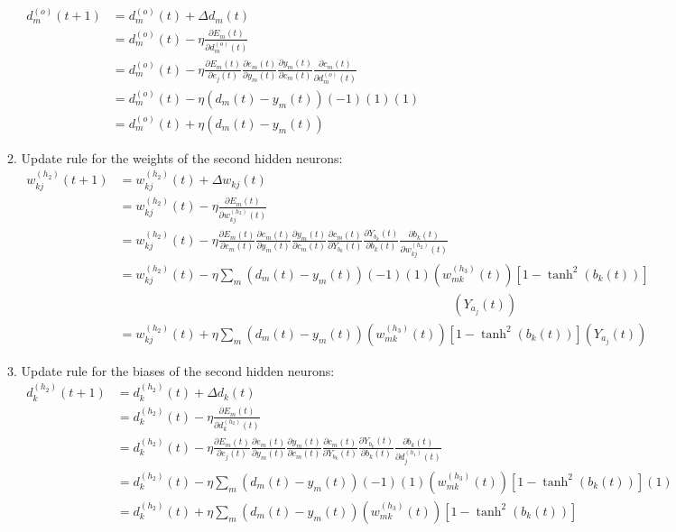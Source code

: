 \documentclass[12pt,a4paper]{article}
\begin{document}
\begin{CJK}{UTF8}{bsmi}
\begin{enumerate}
\begin{enumerate}
\\
$
\begin{aligned}
d_{m}^{(o)}(t+1) & =d_{m}^{(o)}(t)+\Delta d_{m}(t)
\\[0.5cm]
& =d_{m}^{(o)}(t)-\eta\frac{\partial E_m(t)}{\partial d_{m}^{(o)}(t)}
\\[0.5cm]
& =d_{m}^{(o)}(t)-\eta\frac{\partial E_m(t)}{\partial e_{j}(t)}
\frac{\partial e_{m}(t)}{\partial y_m(t)}
\frac{\partial y_m(t)}{\partial c_{m}(t)}
\frac{\partial c_m(t)}{\partial d_{m}^{(o)}(t)}
\\[0.5cm]
& =d_{m}^{(o)}(t)-\eta(d_m(t)-y_m(t))(-1)(1)(1)
\\[0.5cm]
& =d_{m}^{(o)}(t)+\eta(d_m(t)-y_m(t))
\end{aligned}
$
\newpage

	\item Update rule for the weights of the second hidden neurons:
\vspace{0.5cm}
\\
$
\begin{aligned}
w_{kj}^{(h_2)}(t+1) & =w_{kj}^{(h_2)}(t)+\Delta w_{kj}(t)
\\[0.5cm]
& =	w_{kj}^{(h_2)}(t)-\eta\frac{\partial E_m(t)}{\partial w_{kj}^{(h_2)}(t)}
\\[0.5cm]
& = w_{kj}^{(h_2)}(t)-\eta\frac{\partial E_m(t)}{\partial e_{m}(t)}
\frac{\partial e_{m}(t)}{\partial y_m(t)}
\frac{\partial y_m(t)}{\partial c_{m}(t)}
\frac{\partial c_m(t)}{\partial Y_{b_k}(t)}
\frac{\partial Y_{b_k}(t)}{\partial b_k(t)}
\frac{\partial b_k(t)}{\partial w_{kj}^{(h_2)}(t)}
\\[0.5cm]
& = w_{kj}^{(h_2)}(t)-\eta\sum_m(d_m(t)-y_m(t))(-1)(1)(w_{mk}^{(h_3)}(t))[1-\tanh^2(b_k(t))]
\\[0.5cm]
&\ \hspace{11cm}
(Y_{a_j}(t))
\\[0.5cm]
& = w_{kj}^{(h_2)}(t)+\eta\sum_m(d_m(t)-y_m(t))(w_{mk}^{(h_3)}(t))[1-\tanh^2(b_k(t))](Y_{a_j}(t))
\end{aligned}
$

	\item Update rule for the biases of the second hidden neurons:
\vspace{0.5cm}
\\
$
\begin{aligned}
d_{k}^{(h_2)}(t+1) & =d_{k}^{(h_2)}(t)+\Delta d_{k}(t)
\\[0.5cm]
& =d_{k}^{(h_2)}(t)-\eta\frac{\partial E_m(t)}{\partial d_{k}^{(h_2)}(t)}
\\[0.5cm]
& =d_{k}^{(h_2)}(t)-\eta\frac{\partial E_m(t)}{\partial e_{j}(t)}
\frac{\partial e_{m}(t)}{\partial y_m(t)}
\frac{\partial y_m(t)}{\partial c_{m}(t)}
\frac{\partial c_m(t)}{\partial Y_{b_k}(t)}
\frac{\partial Y_{b_k}(t)}{\partial b_k(t)}
\frac{\partial b_k(t)}{\partial d_j^{(h_1)}(t)}
\\[0.5cm]
& =d_{k}^{(h_2)}(t)-\eta\sum_m(d_m(t)-y_m(t))(-1)(1)(w_{mk}^{(h_3)}(t))[1-\tanh^2(b_k(t))](1)
\\[0.5cm]
& =d_{k}^{(h_2)}(t)+\eta\sum_m(d_m(t)-y_m(t))(w_{mk}^{(h_3)}(t))[1-\tanh^2(b_k(t))]
\end{aligned}
$
\newpage



\end{enumerate}
\end{enumerate}
\end{CJK}
\end{document}

